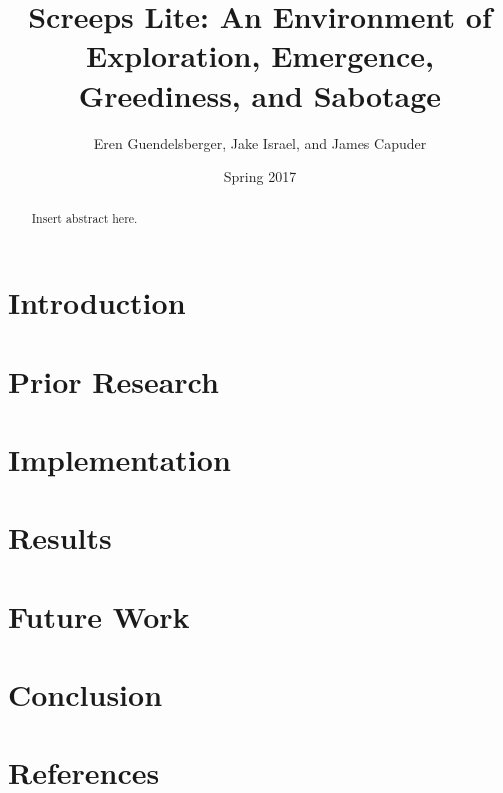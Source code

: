 \documentclass[11pt]{article}
\title{Screeps Lite: An Environment of Exploration, Emergence, Greediness, and Sabotage}
\author{Eren Guendelsberger, Jake Israel, and James Capuder}
\date{Spring 2017}
\begin{document}
\maketitle
\thispagestyle{plain}

\begin{abstract}
Insert abstract here.
\end{abstract}

\section{Introduction}

\section{Prior Research}

\section{Implementation}

\section{Results}

\section{Future Work}

\section{Conclusion}

\section{References}
\end{document}
